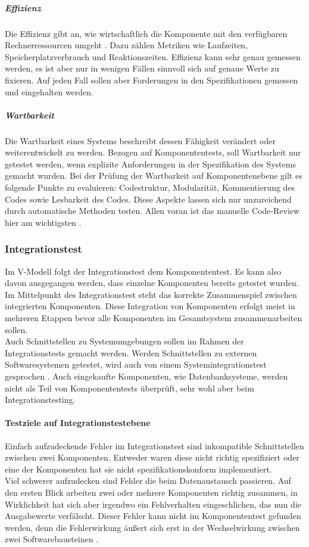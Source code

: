 \subparagraph{Effizienz} Die Effizienz gibt an, wie wirtschaftlich die Komponente mit den verfügbaren Rechnerressourcen umgeht \cite{spillner_basiswissen_2012}. Dazu zählen Metriken wie Laufzeiten, Speicherplatzverbrauch und Reaktionszeiten. Effizienz kann sehr genau gemessen werden, es ist aber nur in wenigen Fällen sinnvoll sich auf genaue Werte zu fixieren. Auf jeden Fall sollen aber Forderungen in den Spezifikationen gemessen und eingehalten werden.

\subparagraph{Wartbarkeit}
Die Wartbarkeit eines Systems beschreibt dessen Fähigkeit verändert oder weiterentwickelt zu werden. Bezogen auf Komponententests, soll Wartbarkeit nur getestet werden, wenn explizite Anforderungen in der Spezifikation des Systems gemacht wurden. Bei der Prüfung der Wartbarkeit auf Komponentenebene gilt es folgende Punkte zu evaluieren: Codestruktur, Modularität, Kommentierung des Codes sowie Lesbarkeit des Codes. Diese Aspekte lassen sich nur unzureichend durch automatische Methoden testen. Allen voran ist das manuelle Code-Review hier am wichtigsten \cite{spillner_basiswissen_2012}.

\subsubsection{Integrationstest}
Im V-Modell folgt der Integrationstest dem Komponententest. Es kann also davon ausgegangen werden, dass einzelne Komponenten bereits getestet wurden. Im Mittelpunkt des Integrationstest steht das korrekte Zusammenspiel zwischen integrierten Komponenten. Diese Integration von Komponenten erfolgt meist in mehreren Etappen bevor alle Komponenten im Gesamtsystem zusammenarbeiten sollen.\\
Auch Schnittstellen zu Systemumgebungen sollen im Rahmen der Integrationstests gemacht werden. Werden Schnittstellen zu externen Softwaresystemen getestet, wird auch von einem Systemintegrationstest gesprochen \cite{spillner_basiswissen_2012}. Auch eingekaufte Komponenten, wie Datenbanksysteme, werden nicht als Teil von Komponententests überprüft, sehr wohl aber beim Integrationstesting.

\paragraph{Testziele auf Integrationstestebene}
Einfach aufzudeckende Fehler im Integrationstest sind inkompatible Schnittstellen zwischen zwei Komponenten. Entweder waren diese nicht richtig spezifiziert oder eine der Komponenten hat sie nicht spezifikationskonform implementiert.\\
Viel schwerer aufzudecken sind Fehler die beim Datenaustausch passieren. Auf den ersten Blick arbeiten zwei oder mehrere Komponenten richtig zusammen, in Wirklichkeit hat sich aber irgendwo ein Fehlverhalten eingeschlichen, das nun die Ausgabewerte verfälscht. Dieser Fehler kann nicht im Komponententest gefunden werden, denn die Fehlerwirkung äußert sich erst in der Wechselwirkung zwischen zwei Softwarebausteinen \cite{spillner_basiswissen_2012}.


